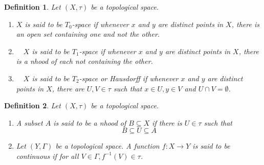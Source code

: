 \documentclass{article}
\newtheorem{definition}{Definition}[subsection]
\theoremstyle{definition}
\begin{document}
\begin{definition}
    Let $(X, \tau)$ be a topological space.
    \begin{enumerate}
        \item $X$ is said to be $T_{0}$-space if whenever $x$ and $y$ are distinct points in $X$, there is an open set containing one and not the other.
        \item $\quad X$ is said to be $T_{1}$-space if whenever $x$ and $y$ are distinct points in $X$, there is a nhood of each not containing the other.
        \item $\quad X$ is said to be $T_{2}$-space or Hausdorff if whenever $x$ and $y$ are distinct points in $X$, there are $U, V \in \tau$ such that $x \in U, y \in V$ and $U \cap V=\emptyset$.
    \end{enumerate}

\end{definition}
\begin{definition}
     Let $(X, \tau)$ be a topological space.
    \begin{enumerate}
        \item  A subset $A$ is said to be a nhood of $B \subseteq X$ if there is $U \in \tau$ such that $$
B \subseteq U \subseteq A
$$
        \item Let $(Y, \Gamma)$ be a topological space. A function $f: X \longrightarrow Y$ is said to be continuous if for all $V \in \Gamma, f^{-1}(V) \in \tau$.


        
    \end{enumerate}
\end{definition}
\end{document}
